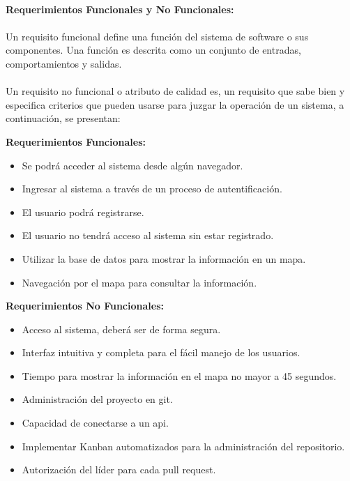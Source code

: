 \documentclass[40pt]{article}
\begin{document}
\maketitle
\textsf{\ \\
\textbf{Requerimientos Funcionales y No Funcionales:} \\
\\
Un requisito funcional define una función del sistema de software o sus componentes. Una función es descrita como un conjunto de entradas, comportamientos y salidas.\\
\\
Un requisito no funcional o atributo de calidad es, un requisito que sabe bien y especifica criterios que pueden usarse para juzgar la operación de un sistema, a continuación, se presentan: \\}

\textbf{Requerimientos Funcionales:}
\begin{itemize}
    \item Se podrá acceder al sistema desde algún navegador.
    \item Ingresar al sistema a través de un proceso de autentificación. 
    \item El usuario podrá registrarse.
    \item El usuario no tendrá acceso al sistema sin estar registrado.
    \item Utilizar la base de datos para mostrar la información en un mapa.
    \item Navegación por el mapa para consultar la información.
\end{itemize}

\newpage

\textbf{Requerimientos No Funcionales:}
\begin{itemize}
    \item Acceso al sistema, deberá ser de forma segura.
    \item Interfaz intuitiva y completa para el fácil manejo de los usuarios. 
    \item Tiempo para mostrar la información en el mapa no mayor a 45 segundos.
    \item Administración del proyecto en git.
    \item Capacidad de conectarse a un api.
    \item Implementar Kanban automatizados para la administración del repositorio.
    \item Autorización del líder para cada pull request.
\end{itemize}
\end{document}
